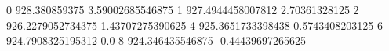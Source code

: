 0 928.380859375 3.59002685546875
1 927.4944458007812 2.70361328125
2 926.2279052734375 1.43707275390625
4 925.3651733398438 0.5743408203125
6 924.7908325195312 0.0
8 924.346435546875 -0.44439697265625
